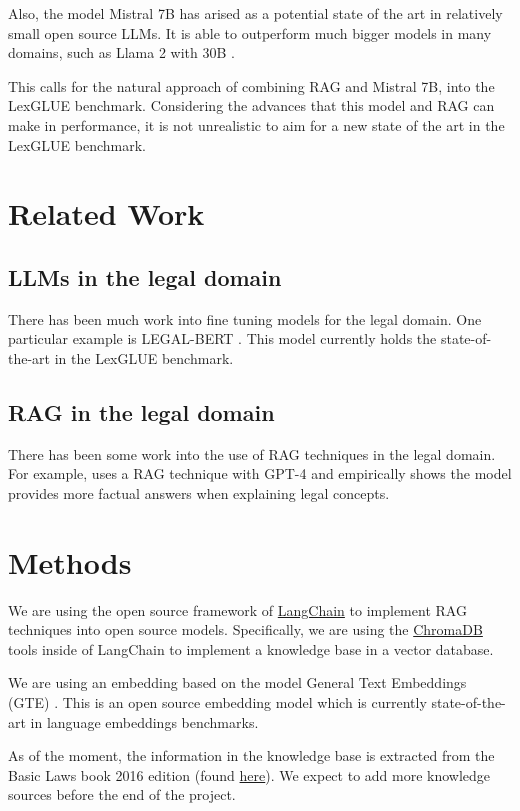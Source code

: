 \documentclass[11pt]{article}
\begin{document}
Also, the model Mistral 7B \cite{jiang2023mistral} has arised as a potential state of the art in relatively small open source LLMs. It is able to outperform much bigger models in many domains, such as Llama 2 with 30B \cite{touvron2023llama}.

This calls for the natural approach of combining RAG and Mistral 7B, into the LexGLUE benchmark. Considering the advances that this model and RAG can make in performance, it is not unrealistic to aim for a new state of the art in the LexGLUE benchmark.
\section{Related Work}
\subsection{LLMs in the legal domain}
There has been much work into fine tuning models for the legal domain. One particular example is LEGAL-BERT  \cite{chalkidis2020legal}. This model currently holds the state-of-the-art in the LexGLUE benchmark.
\subsection{RAG in the legal domain}
There has been some work into the use of RAG techniques in the legal domain. For example, \cite{savelka2023explaining} uses a RAG technique with GPT-4 and empirically shows the model provides more factual answers when explaining legal concepts.
\section{Methods}
We are using the open source framework of \href{https://github.com/langchain-ai/langchain}{LangChain} to implement RAG techniques into open source models. Specifically, we are using the \href{https://github.com/chroma-core/chroma}{ChromaDB} tools inside of LangChain to implement a knowledge base in a vector database.

We are using an embedding based on the model General Text Embeddings (GTE) \cite{li2023towards}. This is an open source embedding model which is currently state-of-the-art in language embeddings benchmarks.


As of the moment, the information in the knowledge base is extracted from the Basic Laws book 2016 edition (found \href{https://www.archives.gov/files/about/laws/basic-laws-book-2016.pdf}{here}). We expect to add more knowledge sources before the end of the project.
\end{document}
